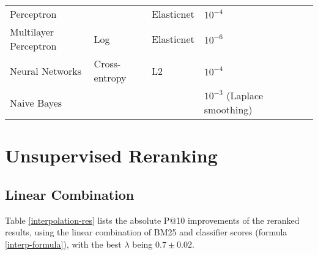 \begin{table}[]
{\begin{tabular}{@{}llllll@{}}
Perceptron                      &			& Elasticnet             & $10^{-4}$                                            &  &  \\
Multilayer Perceptron          & Log			& Elasticnet       & $10^{-6}$                                                        &  &  \\
Neural Networks                 & Cross-entropy		& L2               & $10^{-4}$ &  &  \\ 
Naive Bayes                    	& 			 &              & $10^{-3}$ (Laplace smoothing)                            &  &  \\\bottomrule
\end{tabular}%
}
\end{table}

\section{Unsupervised Reranking}

\subsection{Linear Combination}
Table \ref{interpolation-res} lists the absolute P@10 improvements of the reranked results, using the linear combination of BM25 and classifier scores (formula \ref{interp-formula}),
with the best $\lambda$ being $0.7\pm 0.02$.


